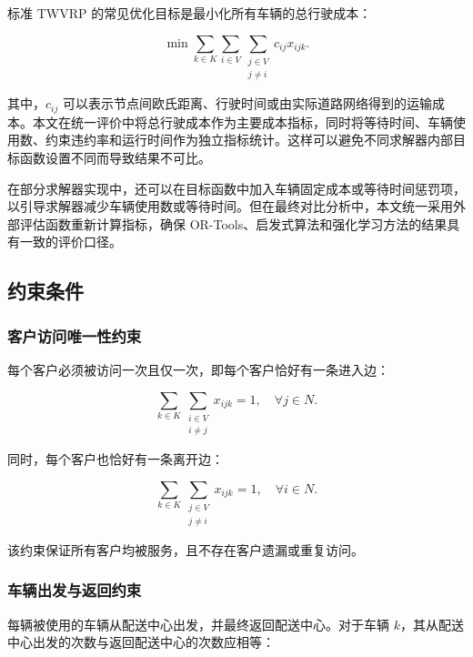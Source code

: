 \documentclass[12pt,a4paper,UTF8]{article}
\begin{document}
标准 TWVRP 的常见优化目标是最小化所有车辆的总行驶成本：

\begin{equation}
    \min \sum_{k\in K}\sum_{i\in V}\sum_{\substack{j\in V\\j\ne i}} c_{ij}x_{ijk}.
    \label{eq:twvrp_objective}
\end{equation}

其中，$c_{ij}$ 可以表示节点间欧氏距离、行驶时间或由实际道路网络得到的运输成本。本文在统一评价中将总行驶成本作为主要成本指标，同时将等待时间、车辆使用数、约束违约率和运行时间作为独立指标统计。这样可以避免不同求解器内部目标函数设置不同而导致结果不可比。

在部分求解器实现中，还可以在目标函数中加入车辆固定成本或等待时间惩罚项，以引导求解器减少车辆使用数或等待时间。但在最终对比分析中，本文统一采用外部评估函数重新计算指标，确保 OR-Tools、启发式算法和强化学习方法的结果具有一致的评价口径。

\subsection{约束条件}

\subsubsection{客户访问唯一性约束}

每个客户必须被访问一次且仅一次，即每个客户恰好有一条进入边：

\begin{equation}
    \sum_{k\in K}\sum_{\substack{i\in V\\i\ne j}}x_{ijk}=1,
    \quad \forall j\in N.
    \label{eq:visit_once_in}
\end{equation}

同时，每个客户也恰好有一条离开边：

\begin{equation}
    \sum_{k\in K}\sum_{\substack{j\in V\\j\ne i}}x_{ijk}=1,
    \quad \forall i\in N.
    \label{eq:visit_once_out}
\end{equation}

该约束保证所有客户均被服务，且不存在客户遗漏或重复访问。

\subsubsection{车辆出发与返回约束}

每辆被使用的车辆从配送中心出发，并最终返回配送中心。对于车辆 $k$，其从配送中心出发的次数与返回配送中心的次数应相等：
\end{document}
